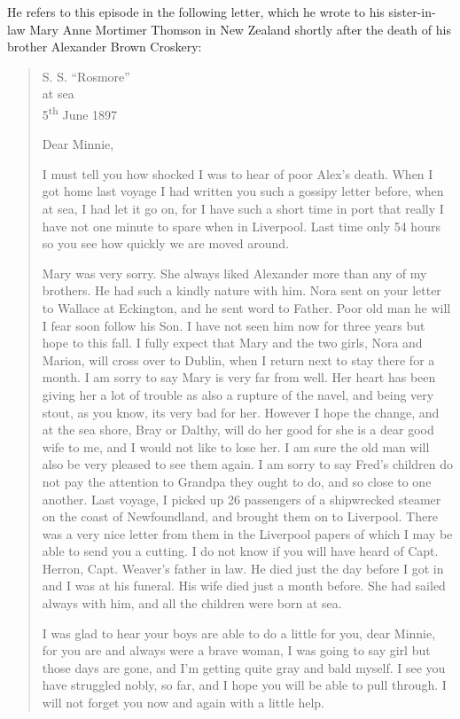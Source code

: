 He refers to this episode in the  following letter, which he wrote to his sister-in-law Mary Anne Mortimer Thomson in New Zealand shortly after the death of his brother Alexander Brown Croskery:\cite{SMWCletter}
\begin{quotation}
\begin{flushright}
S. S. ``Rosmore'' \\
at sea \\
5\textsuperscript{th} June 1897
\end{flushright}

Dear Minnie,

I must tell you how shocked I was to hear of poor Alex's death. When I got home last voyage I had written you such a gossipy letter before, when at sea, I had let it go on, for I have such a short time in port that really I have not one minute to spare when in Liverpool. Last time only 54 hours so you see how quickly we are moved around.

Mary was very sorry. She always liked Alexander more than any of my brothers. He had such a kindly nature with him. Nora sent on your letter to Wallace at Eckington, and he sent word to Father. Poor old man he will I fear soon follow his Son. I have not seen him now for three years but hope to this fall. I fully expect that Mary and the two girls, Nora and Marion, will cross over to Dublin, when I return next to stay there for a month. I am sorry to say Mary is very far from well. Her heart has been giving her a lot of trouble as also a rupture of the navel, and being very stout, as you know, its very bad for her. However I hope the change, and at the sea shore, Bray or Dalthy, will do her good for she is a dear good wife to me, and I would not like to lose her. I am sure the old man will also be very pleased to see them again. I am sorry to say Fred's children do not pay the attention to Grandpa they ought to do, and so close to one another. Last voyage, I picked up 26 passengers of a shipwrecked steamer on the coast of Newfoundland, and brought them on to Liverpool. There was a very nice letter from them in the Liverpool papers of which I may be able to send you a cutting. I do not know if you will have heard of Capt. Herron, Capt. Weaver's father in law. He died just the day before I got in and I was at his funeral. His wife died just a month before. She had sailed always with him, and all the children were born at sea.

I was glad to hear your boys are able to do a little for you, dear Minnie, for you are and always were a brave woman, I was going to say girl but those days are gone, and I'm getting quite gray and bald myself. I see you have struggled nobly, so far, and I hope you will be able to pull through. I will not forget you now and again with a little help.


\end{quotation}
